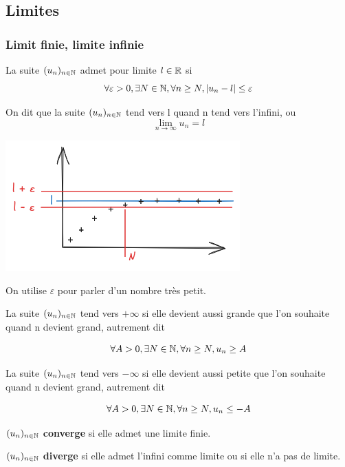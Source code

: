 \documentclass[a4paper, 12pt]{article}
\begin{document}
\subsection{Limites}

\subsubsection{Limit finie, limite infinie}

\begin{definition}
    La suite $(u_n)_{n \in \mathbb{N}}$ admet pour limite $l \in \mathbb{R}$ si
    $$
    \forall \varepsilon > 0, \exists N \in \mathbb{N}, \forall n \geq N, |u_n - l| \leq \varepsilon
    $$

    On dit que la suite $(u_n)_{n \in \mathbb{N}}$ tend vers l quand n tend vers l'infini, ou
    $$
    \lim_{n \to \infty} u_n = l
    $$
\end{definition}

\includegraphics{images/limite.png}

\begin{remark}
    On utilise $\varepsilon$ pour parler d'un nombre très petit.
\end{remark}

\begin{definition}
    La suite $(u_n)_{n \in \mathbb{N}}$ tend vers $+\infty$ si elle devient aussi grande que l'on souhaite quand n
    devient grand, autrement dit

    $$
    \forall A > 0, \exists N \in \mathbb{N}, \forall n \geq N, u_n \geq A
    $$

    La suite $(u_n)_{n \in \mathbb{N}}$ tend vers $-\infty$ si elle devient aussi petite que l'on souhaite quand n
    devient grand, autrement dit

    $$
    \forall A > 0, \exists N \in \mathbb{N}, \forall n \geq N, u_n \leq -A
    $$
\end{definition}

\begin{definition}
    \item $(u_n)_{n \in \mathbb{N}}$ \textbf{converge} si elle admet une limite finie.

    \item $(u_n)_{n \in \mathbb{N}}$ \textbf{diverge} si elle admet l'infini comme limite ou si elle n'a pas de limite.
\end{definition}
\end{document}

